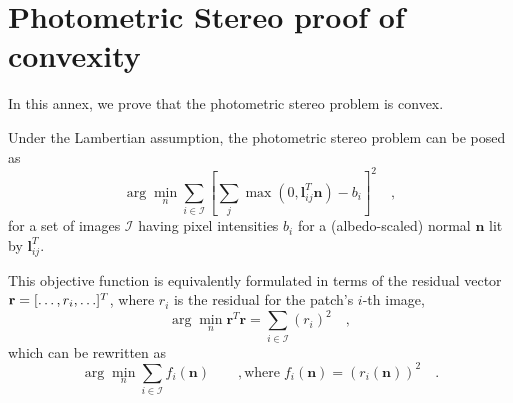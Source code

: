 \chapter{Photometric Stereo proof of convexity}     %
\label{annex2}

In this annex, we prove that the photometric stereo problem is convex.

Under the Lambertian assumption, the photometric stereo problem can be posed as
\begin{equation}
\arg\min_n \sum_{i \in \mathcal{I}} \left[\sum_j \max\left(0, \mathbf{l}_{ij}^T \mathbf{n} \right) - b_i \right]^2 \quad ,
\label{eq:init} 
\end{equation}
for a set of images $\mathcal{I}$ having pixel intensities $b_{i}$ for a (albedo-scaled) normal $\mathbf{n}$ lit by $\mathbf{l}_{ij}^T$.

This objective function is equivalently formulated in terms of the residual vector \mbox{${\bf r} = [\ldots ,  {r_i} , \ldots]^T$}, where $r_i$ is the residual for the patch's $i$-th image,
\begin{equation}
\arg\min_n  \mathbf{r}^T\mathbf{r} = \sum_{i \in \mathcal{I}} (r_i)^2 \quad ,
\end{equation}
%
which can be rewritten as
%
\begin{equation}
\arg\min_n \sum_{i \in \mathcal{I}} f_i(\mathbf{n})
\qquad, \mathrm{where} \; f_i(\mathbf{n}) = \left( r_i(\mathbf{n}) \right)^2 \quad.
\end{equation}
%

